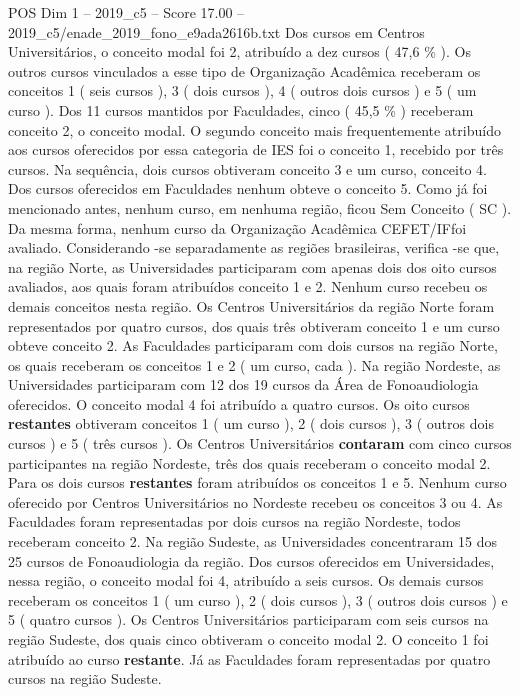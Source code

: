 \begin{textsample}{POS Dim 1 – 2019\_c5 – Score 17.00 – 2019\_c5/enade\_2019\_fono\_e9ada2616b.txt}
Dos cursos em Centros Universitários, o conceito modal foi 2, atribuído a dez cursos ( 47,6 \% ).
Os outros cursos vinculados a esse tipo de Organização Acadêmica receberam os conceitos 1 ( seis cursos ), 3 ( dois cursos ), 4 ( outros dois cursos ) e 5 ( um curso ).
Dos 11 cursos mantidos por Faculdades, cinco ( 45,5 \% ) receberam conceito 2, o conceito modal.
O segundo conceito mais frequentemente atribuído aos cursos oferecidos por essa categoria de IES foi o conceito 1, recebido por três cursos.
Na sequência, dois cursos obtiveram conceito 3 e um curso, conceito 4.
Dos cursos oferecidos em Faculdades nenhum obteve o conceito 5.
Como já foi mencionado antes, nenhum curso, em nenhuma região, ficou Sem Conceito ( SC ).
Da mesma forma, nenhum curso da Organização Acadêmica CEFET/IFfoi avaliado.
Considerando -se separadamente as regiões brasileiras, verifica -se que, na região Norte, as Universidades participaram com apenas dois dos oito cursos avaliados, aos quais foram atribuídos conceito 1 e 2.
Nenhum curso recebeu os demais conceitos nesta região.
Os Centros Universitários da região Norte foram representados por quatro cursos, dos quais três obtiveram conceito 1 e um curso obteve conceito 2.
As Faculdades participaram com dois cursos na região Norte, os quais receberam os conceitos 1 e 2 ( um curso, cada ).
Na região Nordeste, as Universidades participaram com 12 dos 19 cursos da Área de Fonoaudiologia oferecidos.
O conceito modal 4 foi atribuído a quatro cursos.
Os oito cursos \textbf{restantes} obtiveram conceitos 1 ( um curso ), 2 ( dois cursos ), 3 ( outros dois cursos ) e 5 ( três cursos ).
Os Centros Universitários \textbf{contaram} com cinco cursos participantes na região Nordeste, três dos quais receberam o conceito modal 2.
Para os dois cursos \textbf{restantes} foram atribuídos os conceitos 1 e 5.
Nenhum curso oferecido por Centros Universitários no Nordeste recebeu os conceitos 3 ou 4.
As Faculdades foram representadas por dois cursos na região Nordeste, todos receberam conceito 2.
Na região Sudeste, as Universidades concentraram 15 dos 25 cursos de Fonoaudiologia da região.
Dos cursos oferecidos em Universidades, nessa região, o conceito modal foi 4, atribuído a seis cursos.
Os demais cursos receberam os conceitos 1 ( um curso ), 2 ( dois cursos ), 3 ( outros dois cursos ) e 5 ( quatro cursos ).
Os Centros Universitários participaram com seis cursos na região Sudeste, dos quais cinco obtiveram o conceito modal 2.
O conceito 1 foi atribuído ao curso \textbf{restante}.
Já as Faculdades foram representadas por quatro cursos na região Sudeste.

\end{textsample}
